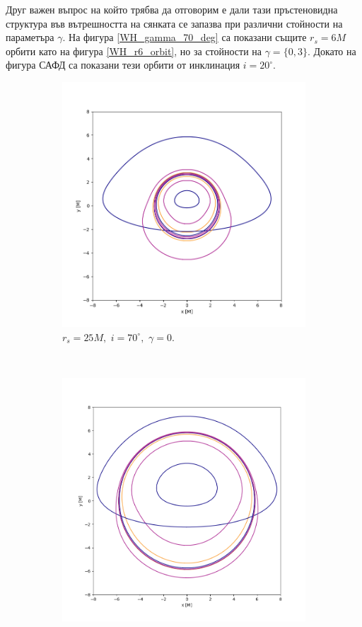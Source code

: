 Друг важен въпрос на който трябва да отговорим е дали тази пръстеновидна структура във вътрешността на сянката се запазва при различни стойности на параметъра $\gamma$. На фигура \ref{WH_gamma_70_deg} са показани същите $r_s = 6M$ орбити като на фигура \ref{WH_r6_orbit}, но за стойности на $\gamma =\{0, 3\}$. Докато на фигура САФД са показани тези орбити от инклинация $i = 20^\circ$.
\newpage
\begin{figure}[!htb]
	\begin{subfigure}{6cm}
		\includegraphics[scale = 0.3]{Wh_70_deg_r6_gamma_0.png}
		\caption{$r_s = 25M,\,\, i = 70^\circ,\,\,\gamma = 0$.} 
	\end{subfigure}\,\,\,
	\begin{subfigure}{6cm}
		\includegraphics[scale = 0.27]{Wh_70_deg_r6_gamma_3.png}

\end{subfigure}
\end{figure}
